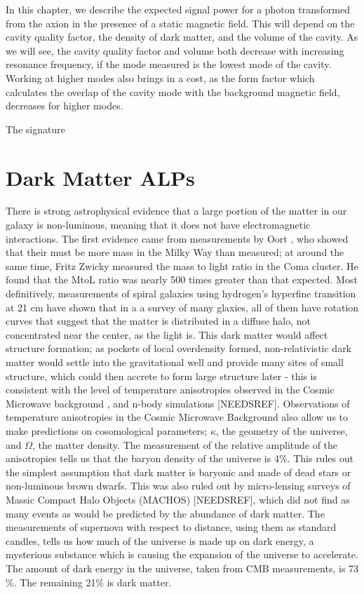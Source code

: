 \documentclass[12pt, twosides]{book}
\begin{document}
In this chapter, we describe the expected signal power for a photon transformed from the axion in the presence of a static magnetic field. This will depend on the cavity quality factor, the density of dark matter, and the volume of the cavity. As we will see, the cavity quality factor and volume both decrease with increasing resonance frequency, if the mode measured is the lowest mode of the cavity. Working at higher modes also brings in a cost, as the form factor which calculates the overlap of the cavity mode with the background magnetic field, decreases for higher modes.

The signature
\section{Dark Matter ALPs}

There is strong astrophysical evidence that a large portion of the matter in our galaxy is non-luminous, meaning that it does not have electromagnetic interactions. The first evidence came from measurements by Oort \cite{oort32}, who showed that their must be more mass in the Milky Way than measured; at around the same time, Fritz Zwicky \cite{zwicky37} measured the mass to light ratio in the Coma cluster. He found that the MtoL ratio was nearly 500 times greater than that expected. Most definitively, measurements of spiral galaxies using hydrogen's hyperfine transition at 21 cm have shown that in a a survey of many glaxies, all of them have rotation curves that suggest that the matter is distributed in a diffuse halo, not concentrated near the center, as the light is\cite{rubin80}. This dark matter would affect structure formation; as pockets of local overdensity formed, non-relativistic dark matter would settle into the gravitational well and provide many sites of small structure, which could then accrete to form large structure later - this is consistent with the level of temperature anisotropies observed in the Cosmic Microwave background \cite{planck13}, and n-body simulations [NEEDSREF]. Observations of temperature anisotropies in the Cosmic Microwave Background also allow us to make predictions on cosomological parameters; $\kappa$, the geometry of the universe, and $\Omega$, the matter density. The measurement of the relative amplitude of the anisotropies tells us that the baryon density of the universe is 4$\%$. This rules out the simplest assumption that dark matter is baryonic and made of dead stars or non-luminous brown dwarfs. This was also ruled out by micro-lensing surveys of Massic Compact Halo Objects (MACHOS) [NEEDSREF], which did not find as many events as would be predicted by the abundance of dark matter. The measurements of supernova with respect to distance, using them as standard candles, tells us how much of the universe is made up on dark energy, a mysterious substance which is causing the expansion of the universe to accelerate. The amount of dark energy in the universe, taken from CMB measurements, is 73$\%$. The remaining 21$\%$ is dark matter.
\end{document}
